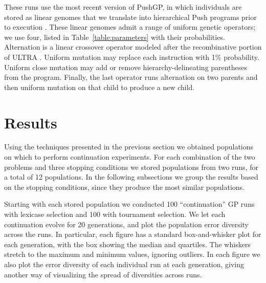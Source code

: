 \documentclass{sig-alternate-05-2015}
\begin{document}
These runs use the most recent version of PushGP, in which individuals are stored as linear genomes that we translate into hierarchical Push programs prior to execution \cite{Helmuth:2015:dissertation}. These linear genomes admit a range of uniform genetic operators; we use four, listed in Table~\ref{table:parameters} with their probabilities. Alternation is a linear crossover operator modeled after the recombinative portion of ULTRA \cite{Spector:2013:GPTP}. Uniform mutation may replace each instruction with 1\% probability. Uniform close mutation may add or remove hierarchy-delineating parentheses from the program.
Finally, the last operator runs alternation on two parents and then uniform mutation on that child to produce a new child.


\section{Results}
\label{sec:results}

Using the techniques presented in the previous section we obtained populations on which to perform continuation experiments. For each combination of the two problems and three stopping conditions we stored populations from two runs, for a total of 12 populations. In the following subsections we group the results based on the stopping conditions, since they produce the most similar populations.

Starting with each stored population we conducted 100 ``continuation'' GP runs with lexicase selection and 100 with tournament selection. We let each continuation evolve for 20 generations, and plot the population error diversity across the runs. In particular, each figure has a standard box-and-whisker plot for each generation, with the box showing the median and quartiles. The whiskers stretch to the maximum and minimum values, ignoring outliers. In each figure we also plot the error diversity of each individual run at each generation, giving another way of visualizing the spread of diversities across runs.
\end{document}

